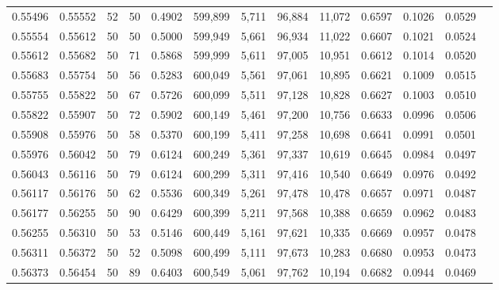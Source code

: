 \begin{tabular}{rrrrrrrrrrrrr}
0.55496 & 0.55552 &    52 &  50 &                                     0.4902 & 599,899 &   5,711 &  96,884 &  11,072 & 0.6597 & 0.1026 & 0.0529 \\
0.55554 & 0.55612 &    50 &  50 &                                     0.5000 & 599,949 &   5,661 &  96,934 &  11,022 & 0.6607 & 0.1021 & 0.0524 \\
0.55612 & 0.55682 &    50 &  71 &                                     0.5868 & 599,999 &   5,611 &  97,005 &  10,951 & 0.6612 & 0.1014 & 0.0520 \\
0.55683 & 0.55754 &    50 &  56 &                                     0.5283 & 600,049 &   5,561 &  97,061 &  10,895 & 0.6621 & 0.1009 & 0.0515 \\
0.55755 & 0.55822 &    50 &  67 &                                     0.5726 & 600,099 &   5,511 &  97,128 &  10,828 & 0.6627 & 0.1003 & 0.0510 \\
0.55822 & 0.55907 &    50 &  72 &                                     0.5902 & 600,149 &   5,461 &  97,200 &  10,756 & 0.6633 & 0.0996 & 0.0506 \\
0.55908 & 0.55976 &    50 &  58 &                                     0.5370 & 600,199 &   5,411 &  97,258 &  10,698 & 0.6641 & 0.0991 & 0.0501 \\
0.55976 & 0.56042 &    50 &  79 &                                     0.6124 & 600,249 &   5,361 &  97,337 &  10,619 & 0.6645 & 0.0984 & 0.0497 \\
0.56043 & 0.56116 &    50 &  79 &                                     0.6124 & 600,299 &   5,311 &  97,416 &  10,540 & 0.6649 & 0.0976 & 0.0492 \\
0.56117 & 0.56176 &    50 &  62 &                                     0.5536 & 600,349 &   5,261 &  97,478 &  10,478 & 0.6657 & 0.0971 & 0.0487 \\
0.56177 & 0.56255 &    50 &  90 &                                     0.6429 & 600,399 &   5,211 &  97,568 &  10,388 & 0.6659 & 0.0962 & 0.0483 \\
0.56255 & 0.56310 &    50 &  53 &                                     0.5146 & 600,449 &   5,161 &  97,621 &  10,335 & 0.6669 & 0.0957 & 0.0478 \\
0.56311 & 0.56372 &    50 &  52 &                                     0.5098 & 600,499 &   5,111 &  97,673 &  10,283 & 0.6680 & 0.0953 & 0.0473 \\
0.56373 & 0.56454 &    50 &  89 &                                     0.6403 & 600,549 &   5,061 &  97,762 &  10,194 & 0.6682 & 0.0944 & 0.0469 \\

\end{tabular}
